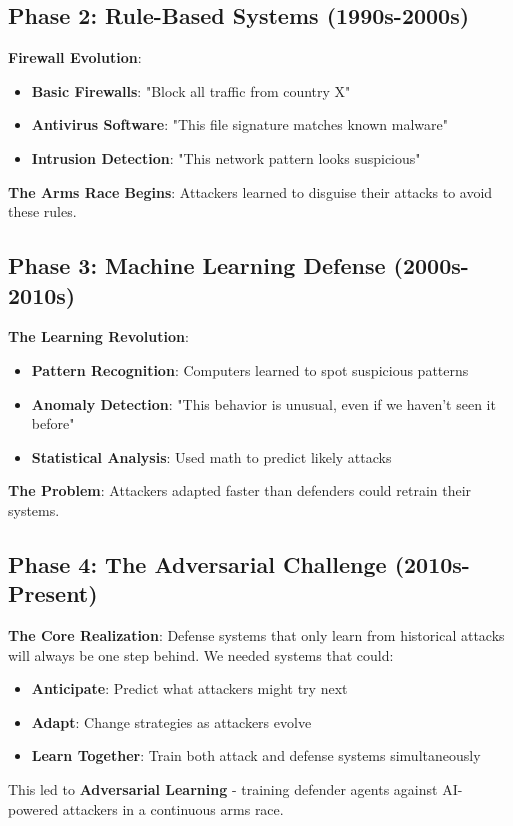 \documentclass[11pt]{article}
\begin{document}
\subsection{Phase 2: Rule-Based Systems (1990s-2000s)}

\begin{example}
\textbf{Firewall Evolution}:
\begin{itemize}
\item \textbf{Basic Firewalls}: "Block all traffic from country X"
\item \textbf{Antivirus Software}: "This file signature matches known malware"
\item \textbf{Intrusion Detection}: "This network pattern looks suspicious"
\end{itemize}

\textbf{The Arms Race Begins}: Attackers learned to disguise their attacks to avoid these rules.
\end{example}

\subsection{Phase 3: Machine Learning Defense (2000s-2010s)}

\begin{mathdetails}
\textbf{The Learning Revolution}:
\begin{itemize}
\item \textbf{Pattern Recognition}: Computers learned to spot suspicious patterns
\item \textbf{Anomaly Detection}: "This behavior is unusual, even if we haven't seen it before"
\item \textbf{Statistical Analysis}: Used math to predict likely attacks
\end{itemize}

\textbf{The Problem}: Attackers adapted faster than defenders could retrain their systems.
\end{mathdetails}

\subsection{Phase 4: The Adversarial Challenge (2010s-Present)}

\begin{foundation}
\textbf{The Core Realization}: Defense systems that only learn from historical attacks will always be one step behind. We needed systems that could:
\begin{itemize}
\item \textbf{Anticipate}: Predict what attackers might try next
\item \textbf{Adapt}: Change strategies as attackers evolve
\item \textbf{Learn Together}: Train both attack and defense systems simultaneously
\end{itemize}

This led to \textbf{Adversarial Learning} - training defender agents against AI-powered attackers in a continuous arms race.
\end{foundation}
\end{document}
